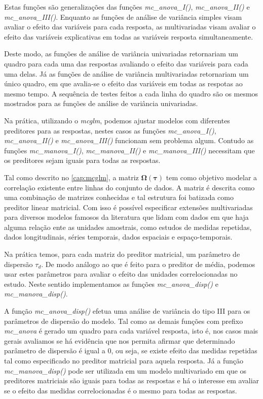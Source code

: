 Estas funções são generalizações das funções \emph{mc\_anova\_I()}, \emph{mc\_anova\_II()} e \emph{mc\_anova\_III()}. Enquanto as funções de análise de variância simples visam avaliar o efeito das variáveis para cada resposta, as multivariadas visam avaliar o efeito das variáveis explicativas em todas as variáveis resposta simultaneamente. 

Deste modo, as funções de análise de variância univariadas retornariam um quadro para cada uma das respostas avaliando o efeito das variáveis para cada uma delas. Já as funções de análise de variância multivariadas retornariam um único quadro, em que avalia-se o efeito das variáveis em todas as respotas ao mesmo tempo. A sequência de testes feitos a cada linha do quadro são os mesmos mostrados para as funções de análise de variância univariadas.

Na prática, utilizando o \emph{mcglm}, podemos ajustar modelos com diferentes preditores para as respostas, nestes casos as funções \emph{mc\_anova\_I()}, \emph{mc\_anova\_II()} e \emph{mc\_anova\_III()} funcionam sem problema algum. Contudo as funções \emph{mc\_manova\_I()}, \emph{mc\_manova\_II()} e \emph{mc\_manova\_III()} necessitam que os preditores sejam iguais para todas as respostas.

Tal como descrito no \autoref{cap:mcglm}, a matriz $\boldsymbol{\Omega({\tau})}$ tem como objetivo modelar a correlação existente entre linhas do conjunto de dados. A matriz é descrita como uma combinação de matrizes conhecidas e tal estrutura foi batizada como preditor linear matricial. Com isso é possível especificar extensões multivariadas para diversos modelos famosos da literatura que lidam com dados em que haja alguma relação ente as unidades amostrais, como estudos de medidas repetidas, dados longitudinais, séries temporais, dados espaciais e espaço-temporais.

Na prática temos, para cada matriz do preditor matricial, um parâmetro de dispersão $\tau_d$. De modo análogo ao que é feito para o preditor de média, podemos usar estes parâmetros para avaliar o efeito das unidades correlocionadas no estudo. Neste sentido implementamos as funções \emph{mc\_anova\_disp()} e \emph{mc\_manova\_disp()}. 

A função \emph{mc\_anova\_disp()} efetua uma análise de variância do tipo III para os parâmetros de dispersão do modelo. Tal como as demais funções com prefixo \emph{mc\_anova} é gerado um quadro para cada variável resposta, isto é, nos casos mais gerais avaliamos se há evidência que nos permita afirmar que determinado parâmetro de dispersão é igual a 0, ou seja, se existe efeito das medidas repetidas tal como especificado no preditor matricial para aquela resposta. Já a função \emph{mc\_manova\_disp()} pode ser utilizada em um modelo multivariado em que os preditores matriciais são iguais para todas as respostas e há o interesse em avaliar se o efeito das medidas correlocionadas é o mesmo para todas as respostas.

